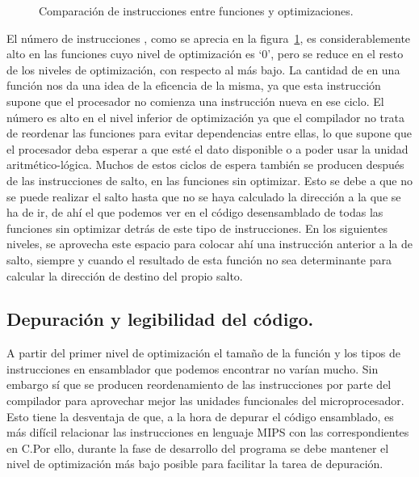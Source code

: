 \begin{figure}[htbp]
\begin{center}
\end{center}
\caption{Comparación de instrucciones  entre funciones y optimizaciones.}
\label{graph:nops}
\end{figure}
El número de instrucciones , como se aprecia en la figura~\ref{graph:nops}, es considerablemente alto en las funciones cuyo nivel de optimización es `0', pero se reduce en el resto de los niveles de optimización, con respecto al más bajo. La cantidad de  en una función nos da una idea de la eficencia de la misma, ya que esta instrucción supone que el procesador no comienza una instrucción nueva en ese ciclo. El número es alto en el nivel inferior de optimización ya que el compilador no trata de reordenar las funciones para evitar dependencias entre ellas, lo que supone que el procesador deba esperar a que esté el dato disponible o a poder usar la unidad aritmético-lógica. Muchos de estos ciclos de espera también se producen después de las instrucciones de salto, en las funciones sin optimizar. Esto se debe a que no se puede realizar el salto hasta que no se haya calculado la dirección a la que se ha de ir, de ahí el  que podemos ver en el código desensamblado de todas las funciones sin optimizar detrás de este tipo de instrucciones. En los siguientes niveles, se aprovecha este espacio para colocar ahí una instrucción anterior a la de salto, siempre y cuando el resultado de esta función no sea determinante para calcular la dirección de destino del propio salto.

\subsection{Depuración y legibilidad del código.} %
\label{sub:Depuración y legibilidad del código.}
A partir del primer nivel de optimización el tamaño de la función y los tipos de instrucciones en ensamblador que podemos encontrar no varían mucho. Sin embargo sí que se producen reordenamiento de las instrucciones por parte del compilador para aprovechar mejor las unidades funcionales del microprocesador. Esto tiene la desventaja de que, a la hora de depurar el código ensamblado, es más difícil relacionar las instrucciones en lenguaje MIPS con las correspondientes en C.\@ Por ello, durante la fase de desarrollo del programa se debe mantener el nivel de optimización más bajo posible para facilitar la tarea de depuración.

